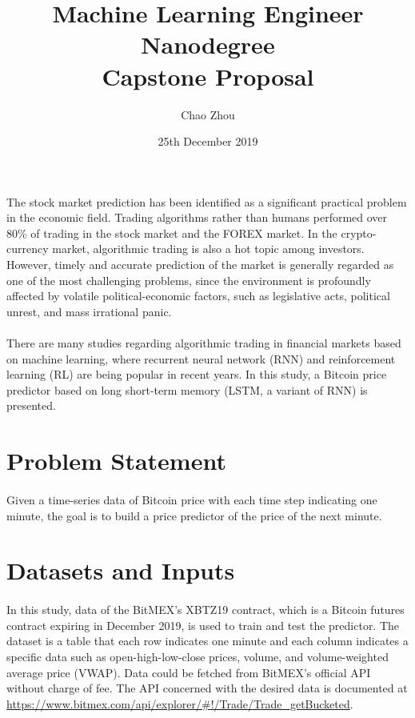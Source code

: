 \documentclass[12pt, letterpaper]{article}
\title{Machine Learning Engineer Nanodegree\\Capstone Proposal}
\author{Chao Zhou}
\date{25th December 2019}
\begin{document}
\maketitle

The stock market prediction has been identified as a significant practical problem in the economic field. Trading algorithms rather than humans performed over 80\% of trading in the stock market and the FOREX market. In the crypto-currency market, algorithmic trading is also a hot topic among investors. However, timely and accurate prediction of the market is generally regarded as one of the most challenging problems, since the environment is profoundly affected by volatile political-economic factors, such as legislative acts, political unrest, and mass irrational panic.

\paragraph{}
There are many studies regarding algorithmic trading in financial markets based on machine learning, where recurrent neural network (RNN) and reinforcement learning (RL) are being popular in recent years. In this study, a Bitcoin price predictor based on long short-term memory (LSTM, a variant of RNN) is presented.

\section{Problem Statement}

\paragraph{}
Given a time-series data of Bitcoin price with each time step indicating one minute, the goal is to build a price predictor of the price of the next minute.

\section{Datasets and Inputs}

\paragraph{}
In this study, data of the BitMEX's XBTZ19 contract, which is a Bitcoin futures contract expiring in December 2019, is used to train and test the predictor. The dataset is a table that each row indicates one minute and each column indicates a specific data such as open-high-low-close prices, volume, and volume-weighted average price (VWAP). Data could be fetched from BitMEX's official API without charge of fee. The API concerned with the desired data is documented at \url{https://www.bitmex.com/api/explorer/#!/Trade/Trade_getBucketed}.
\end{document}
